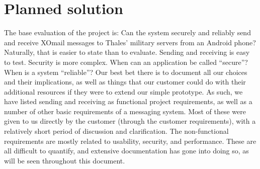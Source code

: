 \section{Planned solution}

The base evaluation of the project is: Can the system securely and reliably send and receive XOmail messages to Thales’ military servers from an Android phone? Naturally, that is easier to state than to evaluate. 
\newline
\newline
Sending and receiving is easy to test. Security is more complex. When can an application be called “secure”? When is a system “reliable”? Our best bet there is to document all our choices and their implications, as well as things that our customer could do with their additional resources if they were to extend our simple prototype. 
\newline
\newline
As such, we have listed sending and receiving as functional project requirements, as well as a number of other basic requirements of a messaging system. Most of these were given to us directly by the customer (through the customer requirements), with a relatively short period of discussion and clarification.
\newline
\newline
The non-functional requirements are mostly related to usability, security, and performance. These are all difficult to quantify, and extensive documentation has gone into doing so, as will be seen throughout this document. 